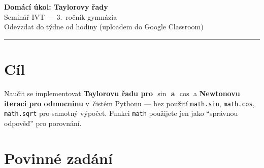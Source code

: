 \documentclass[12pt, a4paper]{article}
\newcommand{\uv}[1]{\enquote{#1}}
\begin{document}

\begin{center}
    {\LARGE \textbf{Domácí úkol: Taylorovy řady}}\\[0.5em]
    {\large Seminář IVT --- 3.~ročník gymnázia}\\[0.3em]
    {\normalsize Odevzdat do týdne od hodiny (uploadem do Google Classroom)}
\end{center}

\bigskip
\hrule
\bigskip

\section*{Cíl}

Naučit se implementovat \textbf{Taylorovu řadu pro $\sin$ a $\cos$}
a \textbf{Newtonovu iteraci pro odmocninu} v~čistém Pythonu ---
bez použití \texttt{math.sin}, \texttt{math.cos}, \texttt{math.sqrt}
pro samotný výpočet.
Funkci \texttt{math} použijete jen jako \uv{správnou odpověď}
pro porovnání.

\bigskip

\section*{Povinné zadání}
\end{document}
